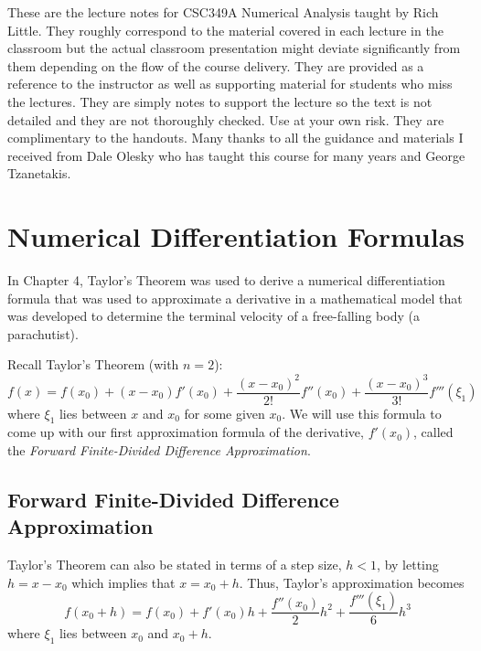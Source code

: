 \documentclass [titlepage,12pt,letter] {article}
\begin{document}
 


These are the lecture notes for CSC349A Numerical Analysis taught by
Rich Little. They roughly correspond to
the material covered in each lecture in the classroom but the actual
classroom presentation might deviate significantly from them depending
on the flow of the course delivery. They are provided as a reference to
the instructor as well as supporting material for students who miss
the lectures. They are simply notes to support the lecture so the text
is not detailed and they are not thoroughly checked. Use at your own
risk. They are complimentary to the handouts. Many thanks to all the
guidance and materials I received from Dale Olesky who has taught this
course for many years and George Tzanetakis. 

\section{Numerical Differentiation Formulas}

In Chapter 4, Taylor’s Theorem was used to derive a numerical differentiation formula that was used to approximate a derivative in a mathematical model that was developed to determine the terminal velocity of a free-falling body (a parachutist).

Recall Taylor's Theorem (with $n=2$):
\[
f(x) = f(x_0) + (x-x_0)f'(x_0) + \frac{(x-x_0)^2}{2!}f''(x_0) + \frac{(x-x_0)^3}{3!}f'''(\xi_1)
\]
where $\xi_1$ lies between $x$ and $x_0$ for some given $x_0$. We will use this formula to come up with our first approximation formula of the derivative, $f'(x_0)$, called the {\it Forward Finite-Divided Difference Approximation}. 

\subsection{Forward Finite-Divided Difference Approximation}

Taylor's Theorem can also be stated in terms of a step size, $h<1$, by letting $h=x-x_0$ which implies that $x=x_0+h$. Thus, Taylor's approximation becomes
\begin{equation}
f(x_0+h) = f(x_0) + f'(x_0)h + \frac{f''(x_0)}{2}h^2 + \frac{f'''(\xi_1)}{6}h^3
\end{equation}
where $\xi_1$ lies between $x_0$ and $x_0+h$.
\end{document}
